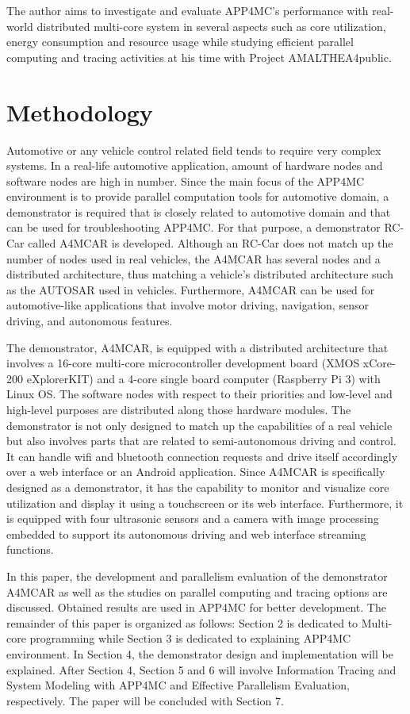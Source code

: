 The author aims to investigate and evaluate APP4MC's performance with real-world distributed multi-core system in several aspects such as core utilization, energy consumption and resource usage while studying efficient parallel computing and tracing activities at his time with Project AMALTHEA4public.

\section{Methodology}

Automotive or any vehicle control related field tends to require very complex systems. In a real-life automotive application, amount of hardware nodes and software nodes are high in number. Since the main focus of the APP4MC environment is to provide parallel computation tools for automotive domain, a demonstrator is required that is closely related to automotive domain and that can be used for troubleshooting APP4MC. For that purpose, a demonstrator RC-Car called A4MCAR is developed. Although an RC-Car does not match up the number of nodes used in real vehicles, the A4MCAR has several nodes and a distributed architecture, thus matching a vehicle's distributed architecture such as the AUTOSAR used in vehicles. Furthermore, A4MCAR can be used for automotive-like applications that involve motor driving, navigation, sensor driving, and autonomous features.

The demonstrator, A4MCAR, is equipped with a distributed architecture that involves a 16-core multi-core microcontroller development board (XMOS xCore-200 eXplorerKIT) and a 4-core single board computer (Raspberry Pi 3) with Linux OS. The software nodes with respect to their priorities and low-level and high-level purposes are distributed along those hardware modules. The demonstrator is not only designed to match up the capabilities of a real vehicle but also involves parts that are related to semi-autonomous driving and control. It can handle wifi and bluetooth connection requests and drive itself accordingly over a web interface or an Android application. Since A4MCAR is specifically designed as a demonstrator, it has the capability to monitor and visualize core utilization and display it using a touchscreen or its web interface. Furthermore, it is equipped with four ultrasonic sensors and a camera with image processing embedded to support its autonomous driving and web interface streaming functions.

In this paper, the development and parallelism evaluation of the demonstrator A4MCAR as well as the studies on parallel computing and tracing options are discussed. Obtained results are used in APP4MC for better development. The remainder of this paper is organized as follows: Section 2 is dedicated to Multi-core programming while Section 3 is dedicated to explaining APP4MC environment. In Section 4, the demonstrator design and implementation will be explained. After Section 4, Section 5 and 6 will involve Information Tracing and System Modeling with APP4MC and Effective Parallelism Evaluation, respectively. The paper will be concluded with Section 7.

